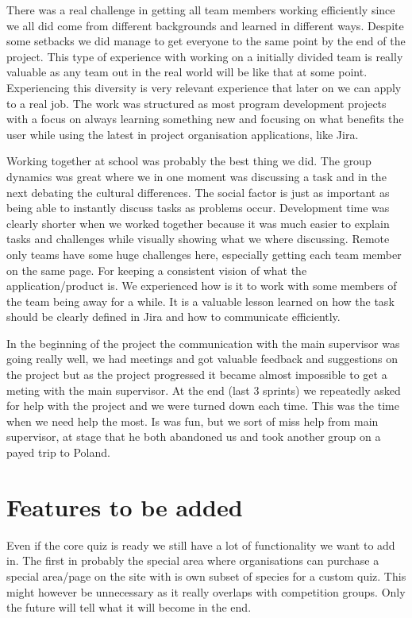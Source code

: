 There was a real challenge in getting all team members working efficiently since we all did come from different backgrounds and learned in different ways. Despite some setbacks we did manage to get everyone to the same point by the end of the project. This type of experience with working on a initially divided team is really valuable as any team out in the real world will be like that at some point. Experiencing this diversity is very relevant experience that later on we can apply to a real job. The work was  structured as most program development projects with a focus on always learning something new and focusing on what benefits the user while using the latest in project organisation applications, like Jira.


Working together at school was probably the best thing we did. The group dynamics was great where we in one moment was discussing a task and in the next debating the cultural differences. The social factor is just as important as being able to instantly discuss tasks as problems occur. Development time was clearly shorter when we worked together because it was much easier to explain tasks and challenges while visually showing what we where discussing. Remote only teams have some huge challenges here, especially getting each team member on the same page. For keeping a consistent vision of what the application/product is. We experienced how is it to work with some members of the team being away for a while. It is a valuable lesson learned on how the task should be clearly defined in Jira and how to communicate efficiently. 

In the beginning of the project the communication with the main supervisor was going really well, we had meetings and got valuable feedback and suggestions on the project but as the project progressed it became almost impossible to get a meting with the main supervisor.
At the end (last 3 sprints) we repeatedly asked for help with the project and we were turned down each time. This was the time when we need help the most. 
Is was fun, but we sort of miss help from main supervisor, at stage that he both abandoned us and took another group on a payed trip to Poland.

\section{Features to be added}
Even if the core quiz is ready we still have a lot of functionality we want to add in. The first in probably the special area where organisations can purchase a special area/page on the site with is own subset of species for a custom quiz. This might however be unnecessary as it really overlaps with competition groups. Only the future will tell what it will become in the end.

